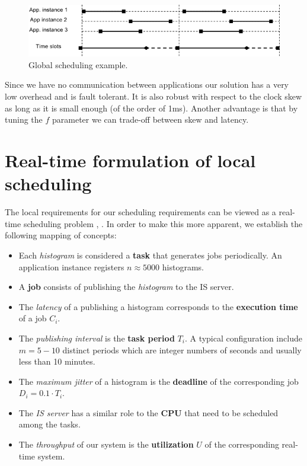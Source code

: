 \begin{figure}[ht!]
\centering
\includegraphics[scale=0.6]{Images/local_sched.png}
\caption{Global scheduling example.}
\label{fig:local_sched}
\end{figure}

Since we have no communication between applications our solution has a very low overhead and is fault tolerant. It is also robust with respect to the clock skew as long as it is small enough (of the order of 1ms). Another advantage is that by tuning the $f$ parameter we can trade-off between skew and latency. 

\section*{Real-time formulation of local scheduling}

The local requirements for our scheduling requirements can be viewed as a real-time scheduling problem \citep{liu1973scheduling}, \citep{sha2004real}. In order to make this more apparent, we establish the following mapping of concepts:
\begin{itemize}
\item Each \emph{histogram} is considered a {\bf task} that generates jobs periodically. An application instance registers $n \approx 5000$ histograms.
\item A {\bf job} consists of publishing the \emph{histogram} to the IS server.
\item The \emph{latency} of a publishing a histogram corresponds to the {\bf execution time} of a job $C_i$. 
\item The \emph{publishing interval} is the {\bf task period} $T_i$. A typical configuration include $m=5-10$ distinct periods which are integer numbers of seconds and usually less than 10 minutes.
\item The \emph{maximum jitter} of a histogram is the {\bf deadline} of the corresponding job $D_i=0.1\cdot T_i$.
\item The \emph{IS server} has a similar role to the {\bf CPU} that need to be scheduled among the tasks.
\item The \emph{throughput} of our system is the {\bf utilization} $U$ of the corresponding real-time system.
\end{itemize}

